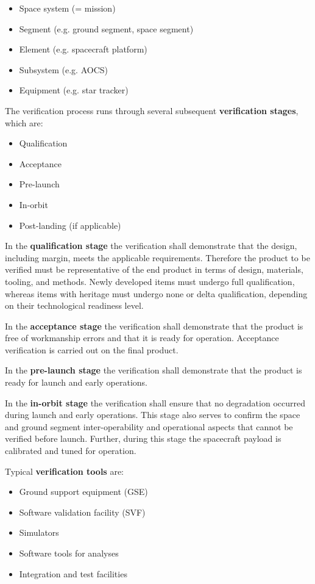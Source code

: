 \begin{itemize}
\item Space system (= mission)
\item Segment (e.g. ground segment, space segment)
\item Element (e.g. spacecraft platform)
\item Subsystem (e.g. AOCS)
\item Equipment (e.g. star tracker)
\end{itemize}

The verification process runs through several subsequent \textbf{verification stages}, which are:

\begin{itemize}
\item Qualification
\item Acceptance 
\item Pre-launch
\item In-orbit
\item Post-landing (if applicable)
\end{itemize}

In the \textbf{qualification stage} the verification shall demonstrate that the design, including margin, meets the applicable requirements. Therefore the product to be verified must be representative of the end product in terms of design, materials, tooling, and methods. Newly developed items must undergo full qualification, whereas items with heritage must undergo none or delta qualification, depending on their technological readiness level.

In the \textbf{acceptance stage} the verification shall demonstrate that the product is free of workmanship errors and that it is ready for operation. Acceptance verification is carried out on the final product. 

In the \textbf{pre-launch stage} the verification shall demonstrate that the product is ready for launch and early operations.

In the \textbf{in-orbit stage} the verification shall ensure that no degradation occurred during launch and early operations. This stage also serves to confirm the space and ground segment inter-operability and operational aspects that cannot be verified before launch. Further, during this stage the spacecraft payload is calibrated and tuned for operation.

Typical \textbf{verification tools} are: 

\begin{itemize}
\item Ground support equipment (GSE)
\item Software validation facility (SVF)
\item Simulators
\item Software tools for analyses
\item Integration and test facilities
\end{itemize}

